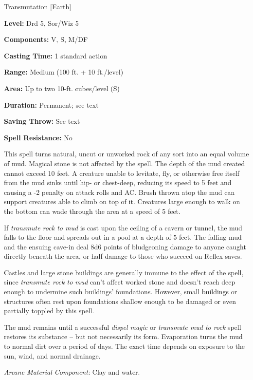 
Transmutation [Earth]

\textbf{Level:} Drd 5, Sor/Wiz 5

\textbf{Components:} V, S, M/DF

\textbf{Casting Time:} 1 standard action

\textbf{Range:} Medium (100 ft. + 10 ft./level)

\textbf{Area:} Up to two 10-ft. cubes/level (S)

\textbf{Duration:} Permanent; see text

\textbf{Saving Throw:} See text

\textbf{Spell Resistance:} No

This spell turns natural, uncut or unworked rock of any sort into an equal volume 
of mud. Magical stone is not affected by the spell. The depth of the mud created 
cannot exceed 10 feet. A creature unable to levitate, fly, or otherwise free itself 
from the mud sinks until hip- or chest-deep, reducing its speed to 5 feet and causing 
a -2 penalty on attack rolls and AC. Brush thrown atop the mud can support creatures 
able to climb on top of it. Creatures large enough to walk on the bottom can wade 
through the area at a speed of 5 feet.

If \textit{transmute rock to mud} is cast upon the ceiling of a cavern or tunnel, 
the mud falls to the floor and spreads out in a pool at a depth of 5 feet. The 
falling mud and the ensuing cave-in deal 8d6 points of bludgeoning damage to anyone 
caught directly beneath the area, or half damage to those who succeed on Reflex 
saves.

Castles and large stone buildings are generally immune to the effect of the spell, 
since \textit{transmute rock to mud} can't affect worked stone and doesn't reach 
deep enough to undermine such buildings' foundations. However, small buildings 
or structures often rest upon foundations shallow enough to be damaged or even 
partially toppled by this spell.

The mud remains until a successful \textit{dispel magic} or \textit{transmute mud 
to rock} spell restores its substance -- but not necessarily its form. Evaporation 
turns the mud to normal dirt over a period of days. The exact time depends on exposure 
to the sun, wind, and normal drainage.

\textit{Arcane Material Component:} Clay and water.


